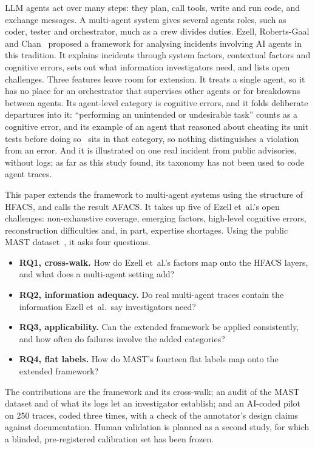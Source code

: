 \documentclass[11pt]{article}
\begin{document}
LLM agents act over many steps: they plan, call tools, write and run code, and
exchange messages. A multi-agent system gives several agents roles, such as coder,
tester and orchestrator, much as a crew divides duties. Ezell, Roberts-Gaal and
Chan~\cite{ezell2025incident} proposed a framework for analysing incidents
involving AI agents in this tradition. It explains incidents through system
factors, contextual factors and cognitive errors, sets out what information
investigators need, and lists open challenges. Three features leave room for
extension. It treats a single agent, so it has no place for an orchestrator that
supervises other agents or for breakdowns between agents. Its agent-level category
is cognitive errors, and it folds deliberate departures into it: ``performing an
unintended or undesirable task'' counts as a cognitive error, and its example of an
agent that reasoned about cheating its unit tests before doing
so~\cite{baker2025monitoring} sits in that category, so nothing distinguishes a
violation from an error. And it is illustrated on one real incident from public
advisories, without logs; as far as this study found, its taxonomy has not been
used to code agent traces.

This paper extends the framework to multi-agent systems using the structure of
HFACS, and calls the result AFACS. It takes up five of Ezell et~al.'s open
challenges: non-exhaustive coverage, emerging factors, high-level cognitive
errors, reconstruction difficulties and, in part, expertise shortages. Using the public MAST dataset~\cite{cemri2025mast}, it asks
four questions.
\begin{itemize}\setlength{\itemsep}{1pt}
  \item \textbf{RQ1, cross-walk.} How do Ezell et~al.'s factors map onto the
  HFACS layers, and what does a multi-agent setting add?
  \item \textbf{RQ2, information adequacy.} Do real multi-agent traces contain the
  information Ezell et~al.\ say investigators need?
  \item \textbf{RQ3, applicability.} Can the extended framework be applied
  consistently, and how often do failures involve the added categories?
  \item \textbf{RQ4, flat labels.} How do MAST's fourteen flat labels map onto the
  extended framework?
\end{itemize}
The contributions are the framework and its cross-walk; an audit of the MAST
dataset and of what its logs let an investigator establish; and an AI-coded pilot
on 250 traces, coded three times, with a check of the annotator's design claims
against documentation. Human validation is planned as a second study, for which a
blinded, pre-registered calibration set has been frozen.
\end{document}
